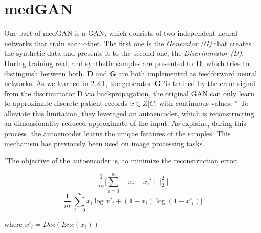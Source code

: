 \documentclass[11pt, a4paper, oneside]{book}
\begin{document}
\section{medGAN}
One part of medGAN is a GAN, which consists of two independent neural networks that train each other. The first one is the \textit{Generator (G)} that creates the synthetic data and presents it to the second one, the \textit{Discriminator (D)}. During training real, and synthetic samples are presented to \textbf{D}, which tries to distinguish between both.
\textbf{D} and \textbf{G} are both implemented as feedforward neural networks.
As we learned in 2.2.1, the generator \textbf{G} "is trained by the error signal from the discriminator D via backpropagation, the original GAN can only learn to approximate discrete patient records $x \in Z|C|$ with continuous values. ” \citep{Choi2017}
To alleviate this limitation, they leveraged an autoencoder, which is reconstructing an dimensionality reduced approximate of the input. As \citep{Choi2017} explains, during this process, the autoencoder learns the unique features of the samples. This mechanism has previously been used on image processing tasks.

"The objective of the autoencoder is, to minimize the reconstruction error:

\begin{equation}
\frac{1}{m}\big[\sum_{i=0}^m \mid\mid x_i - x_i'\mid\mid_2^2]
\end{equation}
\begin{equation}
\frac{1}{m}\big[\sum_{i=0}^m x_i \log x'_i + (1-x_i) \log (1-x'_i)]
\end{equation} 
\begin{center}
where $x'_i = Dec(Enc(x_i))$
\end{center}
\end{document}
